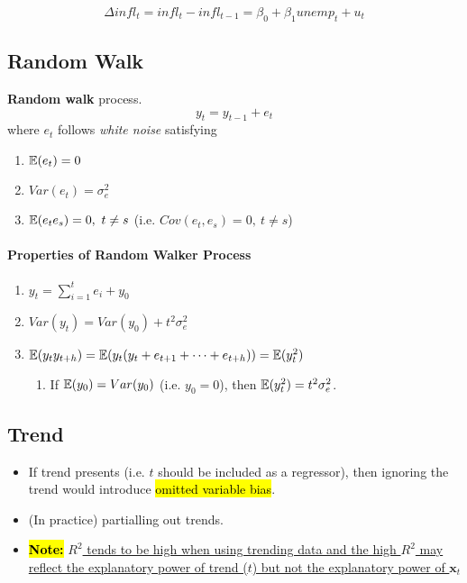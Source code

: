 \documentclass[]{article}
\begin{document}
		\begin{example}
			\[
				\Delta infl_t = infl_t - infl_{t-1} = \beta_0 + \beta_1 unemp_t + u_t
			\]
		\end{example}
		
		\subsection{Random Walk}
		
		\begin{definition}
			\textbf{Random walk} process.
			\[
				y_t = y_{t-1}+ e_t
			\]
			where $e_t$ follows \emph{white noise} satisfying
			\begin{enumerate}
				\item $\mathbb{E}({e_t}) = 0$
				\item $Var(e_t) = \sigma_e^2$
				\item $\mathbb{E}({e_t e_s}) = 0,\ t \neq s$ (i.e. $Cov(e_t, e_s) = 0,\ t \neq s$)
			\end{enumerate}
		\end{definition}
		\paragraph{Properties of Random Walker Process}
			\begin{enumerate}
				\item $y_t = \sum_{i=1}^t e_i + y_0$
				\item $Var(y_t) = Var(y_0) + t^2 \sigma_e^2$
				\item $\mathbb{E}({y_t y_{t+h}}) = \mathbb{E}({y_t (y_t + e_{t+1} + \dots + e_{t+h})}) = \mathbb{E}({y_t^2})$
				\begin{enumerate}
					\item If $\mathbb{E}({y_0}) = Var(y_0)$ (i.e. $y_0=0$), then $\mathbb{E}({y_t^2}) = t^2 \sigma_e^2$.
				\end{enumerate}
			\end{enumerate}
		
		\subsection{Trend}
			\begin{itemize}
				\item If trend presents (i.e. $t$ should be included as a regressor), then ignoring the trend would introduce \hl{omitted variable bias}.
				\item (In practice) partialling out trends.
				\item \hl{\textbf{Note:}} \ul{$R^2$ tends to be high when using trending data and the high $R^2$ may reflect the explanatory power of trend ($t$) but not the explanatory power of $\textbf{x}_t$}
			\end{itemize}
		
\end{document}
